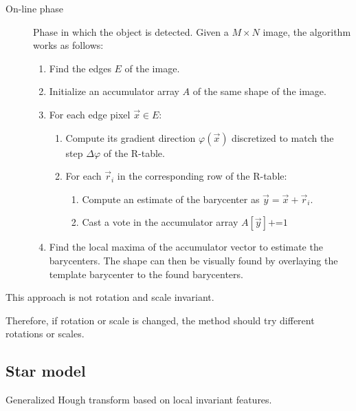 \begin{description}
    \item[On-line phase]
        Phase in which the object is detected.
        Given a $M \times N$ image, the algorithm works as follows:
        \begin{enumerate}
            \item Find the edges $E$ of the image.
            \item Initialize an accumulator array $A$ of the same shape of the image.
            \item For each edge pixel $\vec{x} \in E$:
                \begin{enumerate}
                    \item Compute its gradient direction $\varphi(\vec{x})$ discretized to match the step $\Delta \varphi$ of the R-table.
                    \item For each $\vec{r}_i$ in the corresponding row of the R-table:
                    \begin{enumerate}
                        \item Compute an estimate of the barycenter as $\vec{y} = \vec{x} + \vec{r}_i$.
                        \item Cast a vote in the accumulator array $A[\vec{y}] \texttt{+=} 1$
                    \end{enumerate}
                \end{enumerate}
            \item Find the local maxima of the accumulator vector to estimate the barycenters.
                The shape can then be visually found by overlaying the template barycenter to the found barycenters.
        \end{enumerate}
\end{description}

\begin{remark}
    This approach is not rotation and scale invariant.

    Therefore, if rotation or scale is changed, the method should try different rotations or scales.
\end{remark}


\subsection{Star model}

Generalized Hough transform based on local invariant features.



